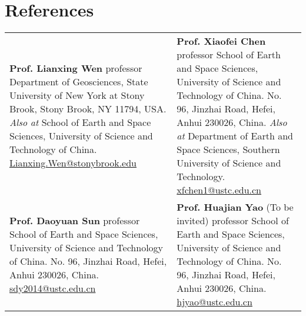 \section*{References}
\renewcommand{\arraystretch}{2.0}

\begin{tabular}{p{} p{}}
\textbf{Prof. Lianxing Wen} \newline
professor \newline
Department of Geosciences, \newline
State University of New York at Stony Brook, \newline
Stony Brook, NY 11794, USA. \newline
\textit{Also at} School of Earth and Space Sciences, \newline
University of Science and Technology of China. \newline
\href{mailto:Lianxing.Wen@stonybrook.edu}{Lianxing.Wen@stonybrook.edu}
&
\textbf{Prof. Xiaofei Chen} \newline
professor \newline
School of Earth and Space Sciences, \newline
University of Science and Technology of China. \newline
No. 96, Jinzhai Road, Hefei, Anhui 230026, China. \newline
\textit{Also at} Department of Earth and Space Sciences, \newline
Southern University of Science and Technology. \newline
\href{mailto:xfchen1@ustc.edu.cn}{xfchen1@ustc.edu.cn}
\\
\textbf{Prof. Daoyuan Sun} \newline
professor \newline
School of Earth and Space Sciences, \newline
University of Science and Technology of China. \newline
No. 96, Jinzhai Road, Hefei, Anhui 230026, China. \newline
\href{mailto:sdy2014@ustc.edu.cn}{sdy2014@ustc.edu.cn}
&
\textbf{Prof. Huajian Yao} (To be invited)\newline
professor \newline
School of Earth and Space Sciences, \newline
University of Science and Technology of China. \newline
No. 96, Jinzhai Road, Hefei, Anhui 230026, China. \newline
\href{mailto:hjyao@ustc.edu.cn}{hjyao@ustc.edu.cn}
\\
\end{tabular}


